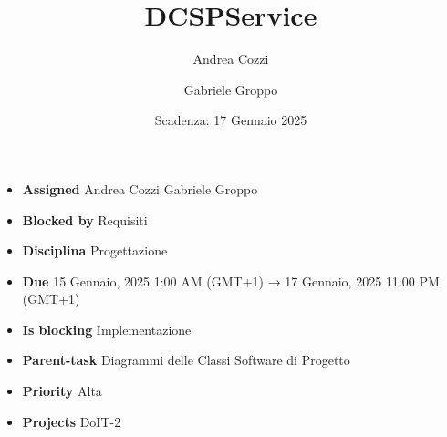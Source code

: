 \title{DCSPService}
\author{Andrea Cozzi \and Gabriele Groppo}
\date{Scadenza: 17 Gennaio 2025}

\maketitle

\begin{itemize}
    \item \textbf{Assigned} Andrea Cozzi Gabriele Groppo
    \item \textbf{Blocked by} Requisiti
    \item \textbf{Disciplina} Progettazione
    \item \textbf{Due} 15 Gennaio, 2025 1:00 AM (GMT+1) → 17 Gennaio, 2025 11:00 PM (GMT+1)
    \item \textbf{Is blocking} Implementazione
    \item \textbf{Parent-task} Diagrammi delle Classi Software di Progetto
    \item \textbf{Priority} Alta
    \item \textbf{Projects} DoIT-2
\end{itemize}